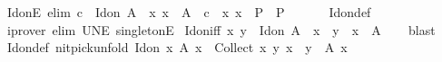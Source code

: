 \begin{isabellebody}
\endisatagproof
{\isafoldproof}%
%
\isadelimproof
\isanewline
%
\endisadelimproof
\isanewline
{}\isamarkupfalse%
\ Id{\isacharunderscore}{\kern0pt}onE\ {\isacharbrackleft}{\kern0pt}elim{\isacharbang}{\kern0pt}{\isacharbrackright}{\kern0pt}{\isacharcolon}{\kern0pt}\ {\isachardoublequoteopen}c\ {\isasymin}\ Id{\isacharunderscore}{\kern0pt}on\ A\ {\isasymLongrightarrow}\ {\isacharparenleft}{\kern0pt}{\isasymAnd}x{\isachardot}{\kern0pt}\ x\ {\isasymin}\ A\ {\isasymLongrightarrow}\ c\ {\isacharequal}{\kern0pt}\ {\isacharparenleft}{\kern0pt}x{\isacharcomma}{\kern0pt}\ x{\isacharparenright}{\kern0pt}\ {\isasymLongrightarrow}\ P{\isacharparenright}{\kern0pt}\ {\isasymLongrightarrow}\ P{\isachardoublequoteclose}\isanewline
\ \ %
\isanewline
%
\isadelimproof
\ \ %
\endisadelimproof
%
\isatagproof
{}\isamarkupfalse%
\ Id{\isacharunderscore}{\kern0pt}on{\isacharunderscore}{\kern0pt}def\ \isamarkupfalse%
\ {\isacharparenleft}{\kern0pt}iprover\ elim{\isacharbang}{\kern0pt}{\isacharcolon}{\kern0pt}\ UN{\isacharunderscore}{\kern0pt}E\ singletonE{\isacharparenright}{\kern0pt}%
\endisatagproof
{\isafoldproof}%
%
\isadelimproof
\isanewline
%
\endisadelimproof
\isanewline
{}\isamarkupfalse%
\ Id{\isacharunderscore}{\kern0pt}on{\isacharunderscore}{\kern0pt}iff{\isacharcolon}{\kern0pt}\ {\isachardoublequoteopen}{\isacharparenleft}{\kern0pt}x{\isacharcomma}{\kern0pt}\ y{\isacharparenright}{\kern0pt}\ {\isasymin}\ Id{\isacharunderscore}{\kern0pt}on\ A\ {\isasymlongleftrightarrow}\ x\ {\isacharequal}{\kern0pt}\ y\ {\isasymand}\ x\ {\isasymin}\ A{\isachardoublequoteclose}\isanewline
%
\isadelimproof
\ \ %
\endisadelimproof
%
\isatagproof
{}\isamarkupfalse%
\ blast%
\endisatagproof
{\isafoldproof}%
%
\isadelimproof
\isanewline
%
\endisadelimproof
\isanewline
{}\isamarkupfalse%
\ Id{\isacharunderscore}{\kern0pt}on{\isacharunderscore}{\kern0pt}def{\isacharprime}{\kern0pt}\ {\isacharbrackleft}{\kern0pt}nitpick{\isacharunderscore}{\kern0pt}unfold{\isacharbrackright}{\kern0pt}{\isacharcolon}{\kern0pt}\ {\isachardoublequoteopen}Id{\isacharunderscore}{\kern0pt}on\ {\isacharbraceleft}{\kern0pt}x{\isachardot}{\kern0pt}\ A\ x{\isacharbraceright}{\kern0pt}\ {\isacharequal}{\kern0pt}\ Collect\ {\isacharparenleft}{\kern0pt}{\isasymlambda}{\isacharparenleft}{\kern0pt}x{\isacharcomma}{\kern0pt}\ y{\isacharparenright}{\kern0pt}{\isachardot}{\kern0pt}\ x\ {\isacharequal}{\kern0pt}\ y\ {\isasymand}\ A\ x{\isacharparenright}{\kern0pt}{\isachardoublequoteclose}\isanewline

\end{isabellebody}
